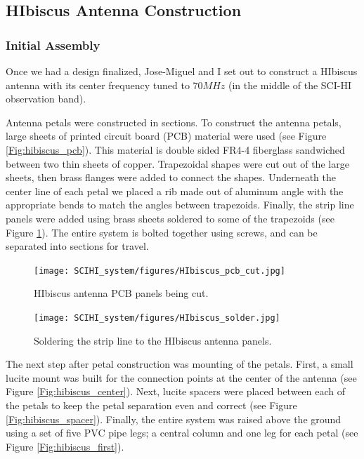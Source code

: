 \subsection{HIbiscus Antenna Construction}

\subsubsection{Initial Assembly}

Once we had a design finalized, Jose-Miguel and I set out to construct a HIbiscus antenna with its center frequency tuned to $70 MHz$ (in the middle of the SCI-HI observation band).

Antenna petals were constructed in sections. To construct the antenna petals, large sheets of printed circuit board (PCB) material were used (see Figure \ref{Fig:hibiscus_pcb}). This material is double sided FR4-4 fiberglass sandwiched between two thin sheets of copper. Trapezoidal shapes were cut out of the large sheets, then brass flanges were added to connect the shapes. Underneath the center line of each petal we placed a rib made out of aluminum angle with the appropriate bends to match the angles between trapezoids. Finally, the strip line panels were added using brass sheets soldered to some of the trapezoids (see Figure \ref{Fig:hibiscus_solder}). The entire system is bolted together using screws, and can be separated into sections for travel. 

\begin{figure}[htb]
\centering
\begin{minipage}[b]{0.39\textwidth}
\centering
\texttt{[image: SCIHI\_system/figures/HIbiscus\_pcb\_cut.jpg]}
\caption{HIbiscus antenna PCB panels being cut. }
\label{Fig:hibiscus_pcb}
\end{minipage}%
\begin{minipage}[b]{0.02\textwidth}
\hspace{1cm}
\end{minipage}%
\begin{minipage}[b]{0.55\textwidth}
\centering
\texttt{[image: SCIHI\_system/figures/HIbiscus\_solder.jpg]}
\caption{Soldering the strip line to the HIbiscus antenna panels.}
\label{Fig:hibiscus_solder}
\end{minipage}
\end{figure} 

The next step after petal construction was mounting of the petals. First, a small lucite mount was built for the connection points at the center of the antenna (see Figure \ref{Fig:hibiscus_center}). Next, lucite spacers were placed between each of the petals to keep the petal separation even and correct (see Figure \ref{Fig:hibiscus_spacer}). Finally, the entire system was raised above the ground using a set of five PVC pipe legs; a central column and one leg for each petal (see Figure \ref{Fig:hibiscus_first}). 

